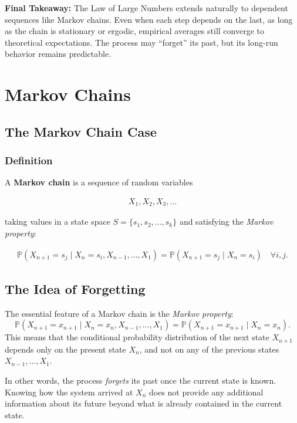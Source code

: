 \bigskip

\noindent
\textbf{Final Takeaway:}  
The Law of Large Numbers extends naturally to dependent sequences like Markov chains.  
Even when each step depends on the last, as long as the chain is stationary or ergodic, empirical averages still converge to theoretical expectations.  
The process may “forget” its past, but its long-run behavior remains predictable.

\chapter{Markov Chains}


\section*{The Markov Chain Case}

\subsection*{Definition}

A \textbf{Markov chain} is a sequence of random variables

\begin{align}
X_1, X_2, X_3, \dots
\end{align}

taking values in a state space \( S = \{ s_1, s_2, \dots, s_k \} \)
and satisfying the \emph{Markov property}:

\begin{align}
\mathbb{P}(X_{n+1} = s_j \mid X_n = s_i, X_{n-1}, \dots, X_1)
= \mathbb{P}(X_{n+1} = s_j \mid X_n = s_i)
\quad \forall i, j.
\end{align}




\section*{The Idea of Forgetting}

The essential feature of a Markov chain is the \emph{Markov property}:
\[
\mathbb{P}(X_{n+1} = x_{n+1} \mid X_n = x_n, X_{n-1}, \dots, X_1)
= \mathbb{P}(X_{n+1} = x_{n+1} \mid X_n = x_n).
\]
This means that the conditional probability distribution of the next state $X_{n+1}$ 
depends only on the present state $X_n$, and not on any of the previous states 
$X_{n-1}, \dots, X_1$. 

In other words, the process \emph{forgets} its past once the current state is known. 
Knowing how the system arrived at $X_n$ does not provide any additional information 
about its future beyond what is already contained in the current state. 

